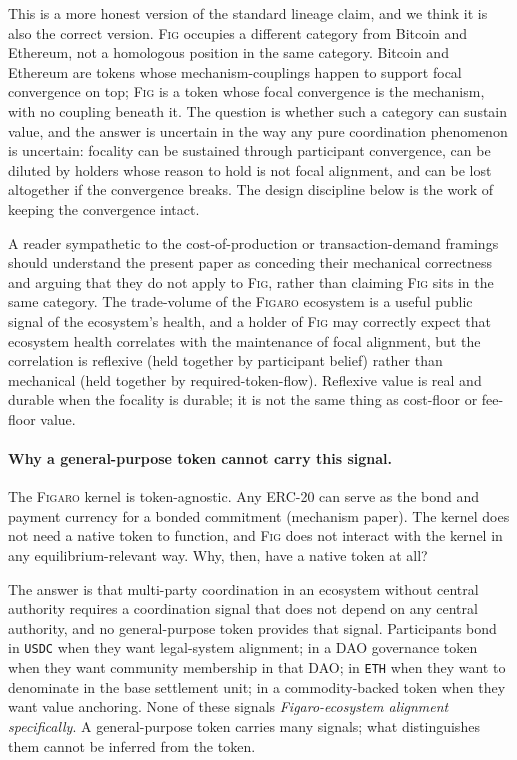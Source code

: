\documentclass[11pt,a4paper]{article}
\theoremstyle{definition}
\theoremstyle{remark}
\newcommand{\figaro}{\textsc{Figaro}}
\newcommand{\fig}{\textsc{Fig}}
\begin{document}
This is a more honest version of the standard lineage claim,
and we think it is also the correct version. \fig{} occupies
a different category from Bitcoin and Ethereum, not a
homologous position in the same category. Bitcoin and
Ethereum are tokens whose mechanism-couplings happen to
support focal convergence on top; \fig{} is a token whose
focal convergence is the mechanism, with no coupling beneath
it. The question is whether such a category can sustain
value, and the answer is uncertain in the way any pure
coordination phenomenon is uncertain: focality can be
sustained through participant convergence, can be diluted by
holders whose reason to hold is not focal alignment, and can
be lost altogether if the convergence breaks. The design
discipline below is the work of keeping the convergence
intact.

A reader sympathetic to the cost-of-production or
transaction-demand framings should understand the present
paper as conceding their mechanical correctness and arguing
that they do not apply to \fig{}, rather than claiming
\fig{} sits in the same category. The trade-volume of the
\figaro{} ecosystem is a useful public signal of the
ecosystem's health, and a holder of \fig{} may correctly
expect that ecosystem health correlates with the maintenance
of focal alignment, but the correlation is reflexive (held
together by participant belief) rather than mechanical (held
together by required-token-flow). Reflexive value is real
and durable when the focality is durable; it is not the same
thing as cost-floor or fee-floor value.

\paragraph{Why a general-purpose token cannot carry this signal.}
The \figaro{} kernel is token-agnostic. Any ERC-20 can serve as
the bond and payment currency for a bonded
commitment (mechanism paper). The kernel does not need
a native token to function, and \fig{} does not interact with
the kernel in any equilibrium-relevant way. Why, then, have a
native token at all?

The answer is that multi-party coordination in an ecosystem
without central authority requires a coordination signal that
does not depend on any central authority, and no general-purpose
token provides that signal. Participants bond in \texttt{USDC}
when they want legal-system alignment; in a DAO governance token
when they want community membership in that DAO; in \texttt{ETH}
when they want to denominate in the base settlement unit; in a
commodity-backed token when they want value anchoring. None of
these signals \emph{Figaro-ecosystem alignment specifically}. A
general-purpose token carries many signals; what distinguishes
them cannot be inferred from the token.
\end{document}
